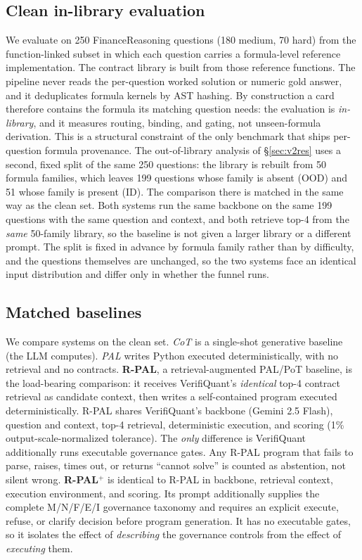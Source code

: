 \documentclass[sigconf,anonymous]{acmart}
\begin{document}
\subsection{Clean in-library evaluation}
We evaluate on 250 FinanceReasoning \cite{tang2025financereasoning} questions (180 medium, 70 hard) from the function-linked subset in which each question carries a formula-level reference implementation.
The contract library is built from those reference functions. The pipeline never reads the per-question worked solution or numeric gold answer, and it deduplicates formula kernels by AST hashing.
By construction a card therefore contains the formula its matching question needs: the evaluation is \emph{in-library}, and it measures routing, binding, and gating, not unseen-formula derivation.
This is a structural constraint of the only benchmark that ships per-question formula provenance.
The out-of-library analysis of \S\ref{sec:v2res} uses a second, fixed split of the same 250 questions: the library is rebuilt from 50 formula families, which leaves 199 questions whose family is absent (OOD) and 51 whose family is present (ID). The comparison there is matched in the same way as the clean set. Both systems run the same backbone on the same 199 questions with the same question and context, and both retrieve top-4 from the \emph{same} 50-family library, so the baseline is not given a larger library or a different prompt. The split is fixed in advance by formula family rather than by difficulty, and the questions themselves are unchanged, so the two systems face an identical input distribution and differ only in whether the funnel runs.

\subsection{Matched baselines}
We compare systems on the clean set.
\emph{CoT} is a single-shot generative baseline (the LLM computes).
\emph{PAL} writes Python executed deterministically, with no retrieval and no contracts.
\textbf{R-PAL}, a retrieval-augmented PAL/PoT baseline, is the load-bearing comparison: it receives VerifiQuant's \emph{identical} top-4 contract retrieval as candidate context, then writes a self-contained program executed deterministically.
R-PAL shares VerifiQuant's backbone (Gemini 2.5 Flash), question and context, top-4 retrieval, deterministic execution, and scoring (1\% output-scale-normalized tolerance). The \emph{only} difference is VerifiQuant additionally runs executable governance gates.
Any R-PAL program that fails to parse, raises, times out, or returns ``cannot solve'' is counted as abstention, not silent wrong.
\textbf{R-PAL$^{+}$} is identical to R-PAL in backbone, retrieval context, execution environment, and scoring. Its prompt additionally supplies the complete M/N/F/E/I governance taxonomy and requires an explicit execute, refuse, or clarify decision before program generation. It has no executable gates, so it isolates the effect of \emph{describing} the governance controls from the effect of \emph{executing} them.
\end{document}
